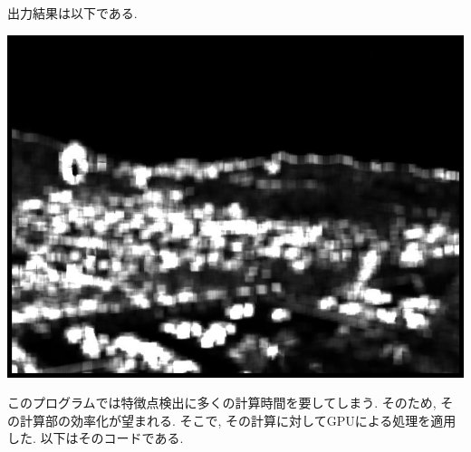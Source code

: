 \documentclass[a4j]{jarticle}
\begin{document}
出力結果は以下である.
\begin{center}
\includegraphics[bb=0 0 768 576,scale=.35]{../4/out.jpg}
\end{center}
このプログラムでは特徴点検出に多くの計算時間を要してしまう. 
そのため, その計算部の効率化が望まれる. 
そこで, その計算に対してGPUによる処理を適用した. 
以下はそのコードである. 
\end{document}
